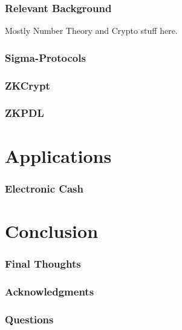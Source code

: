 \documentclass{beamer}
\begin{document}
\begin{frame}
	\frametitle{Relevant Background}
	Mostly Number Theory and Crypto stuff here.
\end{frame}

\begin{frame}
	\frametitle{Sigma-Protocols}
\end{frame}

\begin{frame}
	\frametitle{ZKCrypt}
\end{frame}

\begin{frame}
	\frametitle{ZKPDL}
\end{frame}

\section*{Applications}

\begin{frame}
	\frametitle{Electronic Cash}
\end{frame}

\section*{Conclusion}

\begin{frame}
	\frametitle{Final Thoughts}
\end{frame}

\begin{frame}
	\frametitle{Acknowledgments}
\end{frame}

\begin{frame}
	\frametitle{Questions}
\end{frame}
\end{document}
